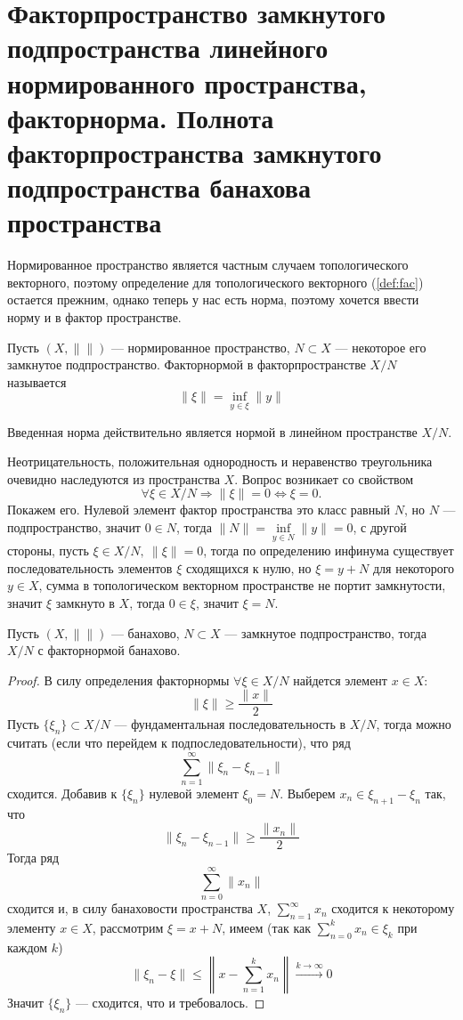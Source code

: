 \newpage
\section{Факторпространство замкнутого подпространства линейного нормированного пространства, факторнорма. Полнота факторпространства замкнутого подпространства банахова пространства}

Нормированное пространство является частным случаем топологического векторного, поэтому определение для топологического векторного (\ref{def:fac}) остается прежним, однако теперь у нас есть норма, поэтому хочется ввести норму и в фактор пространстве.
\begin{definition}
	Пусть $(X, \|\|)$ --- нормированное пространство, $N\subset X$ --- некоторое его замкнутое подпространство. Факторнормой в факторпространстве $X / N$ называется 
	$$
	\|\xi\| = \inf_{y \in \xi} \|y\|
	$$ 
\end{definition}
\begin{claim}
	Введенная норма действительно является нормой в линейном пространстве $X / N$.
\end{claim}
\begin{claim}
	Неотрицательность, положительная однородность и неравенство треугольника очевидно наследуются из пространства $X$. Вопрос возникает со свойством $$\forall \xi \in X / N \Rightarrow \|\xi\| = 0 \Leftrightarrow \xi = 0.$$
	Покажем его. Нулевой элемент фактор пространства это класс равный $N$, но $N$ --- подпространство, значит $0 \in N$, тогда $\|N\| = \inf\limits_{y \in N}\|y\| = 0$, с другой стороны, пусть $\xi \in X / N, \ \|\xi\| = 0$, тогда по определению инфинума существует последовательность элементов $\xi$ сходящихся к нулю, но $\xi = y +N$ для некоторого $y \in X$, сумма в топологическом векторном пространстве не портит замкнутости, значит $\xi$ замкнуто в $X$, тогда $0 \in \xi$, значит $\xi = N$.
\end{claim}

\begin{claim}\label{cl:factorbanach}
	Пусть $(X, \|\|)$ --- банахово, $N \subset X$ --- замкнутое подпространство, тогда $X / N$ с факторнормой банахово.
\end{claim}
\begin{proof}
	В силу определения факторнормы $\forall \xi \in X / N$ найдется элемент $x \in X$: 
	$$
	\|\xi\| \geq \frac{\|x\|}{2}
	$$
	Пусть $\{\xi_n\}\subset X / N$ --- фундаментальная последовательность в $X / N$, тогда можно считать (если что перейдем к подпоследовательности), что ряд 
	$$
	\sum_{n=1}^\infty \|\xi_n - \xi_{n-1}\| 
	$$
	сходится. Добавив к $\{\xi_n\}$ нулевой элемент $\xi_0 = N$. Выберем $x_n \in \xi_{n+1} - \xi_n$ так, что 
	$$
	\|\xi_n - \xi_{n-1}\| \geq \frac{\|x_n\|}{2}
	$$
	Тогда ряд 
	$$
	\sum_{n=0}^\infty \|x_n\|
	$$
	сходится и, в силу банаховости пространства $X$, $\sum_{n=1}^\infty x_n$ сходится к некоторому элементу $x \in X$, рассмотрим $\xi = x + N$, имеем (так как $\sum_{n=0}^k x_n \in \xi_k$ при каждом $k$)
	$$
	\|\xi_n - \xi\| \leq \left\| x - \sum_{n=1}^k x_n\right\| \xrightarrow{k \to \infty}0
	$$
	Значит $\{\xi_n\}$ --- сходится, что и требовалось.
\end{proof}
	